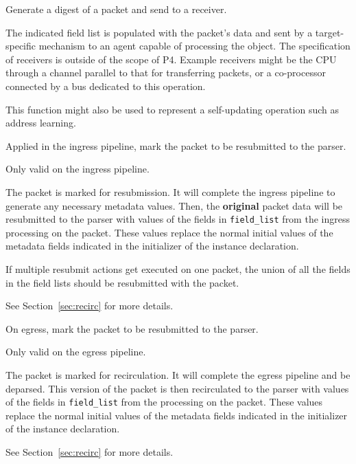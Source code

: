 \documentclass[12pt]{article}
\begin{document}

{ %
Generate a digest of a packet and send to a receiver.
}
{ %
}
{ %
The indicated field list is populated with the packet's data and sent by
a target-specific mechanism to an agent capable of processing the object.
 The specification of receivers is outside of the scope of P4. Example receivers
might be the CPU through a channel parallel to that for transferring packets,
or a co-processor connected by a bus dedicated to this operation.

This function might also be used to represent a self-updating operation such
as address learning.
}


{%
Applied in the ingress pipeline, mark the packet to be resubmitted to the
parser.
}
{ %
}
{ %
Only valid on the ingress pipeline.

The packet is marked for resubmission. It will complete the ingress pipeline
to generate any necessary metadata values. Then, the \textbf{original} packet data
will be resubmitted to the parser with values of the fields in \texttt{field_list} from
the ingress processing on the packet. These values replace the normal initial
values of the metadata fields indicated in the initializer of the instance
declaration.

If multiple resubmit actions get executed on one packet, the union of all
the fields in the field lists should be resubmitted with the packet.

See Section~\ref{sec:recirc} for more details.

}


{ %
On egress, mark the packet to be resubmitted to the parser.
}
{ %
}
{ %
Only valid on the egress pipeline.

The packet is marked for recirculation. It will complete the egress pipeline
and be deparsed.  This version of the packet is then recirculated to the parser
with values of the fields in \texttt{field_list} from the processing on the packet.
These values replace the normal initial values of the metadata fields indicated
in the initializer of the instance declaration.

See Section~\ref{sec:recirc} for more details.

}
\end{document}
